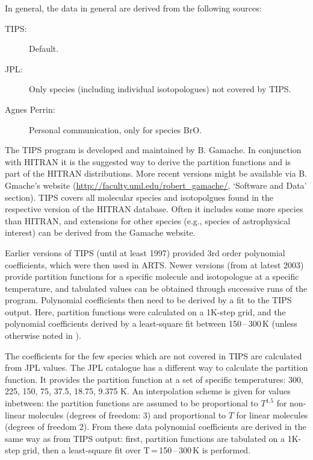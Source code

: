 In general, the data in general are derived from the following sources:
\begin{description}
\item[TIPS:] Default.
\item[JPL:] Only species (including individual isotopologues) not covered by TIPS.
\item[Agnes Perrin:] Personal communication, only for species BrO.
\end{description}

The TIPS program is developed and maintained by B. Gamache. In conjunction
with HITRAN it is the suggested way to derive the partition functions and is part of the HITRAN distributions. More recent versions might be available via B. Gmache's website (\url{http://faculty.uml.edu/robert_gamache/}, `Software and Data' section). TIPS covers all molecular species and isotopolgues found in the respective version of the HITRAN database. Often it includes some more species than HITRAN, and extensions for other species (e.g., species of astrophysical interest) can be derived from the Gamache website.

Earlier versions of TIPS (until at least 1997) provided 3rd order polynomial
coefficients, which were then used in ARTS.
Newer versions (from at latest 2003) provide partition
functions for a specific molecule and isotopologue at a specific temperature,
and tabulated values can be obtained through successive runs of the program.
Polynomial coefficients then need to be derived by a fit to the TIPS output.
Here, partition functions were calculated on a 1K-step grid, and the polynomial
coefficients derived by a least-square fit between 150\,--\,300\,K (unless
otherwise noted in ).

The coefficients for the few species which are not covered in
TIPS are calculated from JPL values. The JPL catalogue has a
different way to calculate the partition function. It provides the
partition function at a set of specific temperatures: 300, 225, 150, 75, 37.5,
18.75, 9.375 K. An interpolation scheme is given for values
inbetween: the partition functions are assumed to be proportional to $T^{1.5}$
for non-linear molecules (degrees of freedom: 3) and proportional to $T$ for
linear molecules (degrees of freedom 2).
From these data polynomial coefficients are derived in the same way as from TIPS
output: first, partition functions are tabulated on a 1K-step grid, then a
least-square fit over T\,=\,150\,--\,300\,K is performed.

